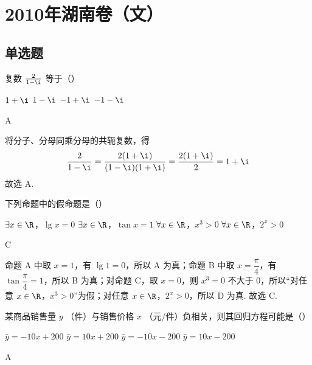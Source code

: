 \chapter{2010年湖南卷（文）}

\section{单选题}

\begin{problem}
复数 \(\frac{2}{1 - \i}\) 等于（\quad）

\choices
    {\(1 + \i\)}
    {\(1 - \i\)}
    {\(-1 + \i\)}
    {\(-1 - \i\)}
\end{problem}

\begin{answer}
A
\end{answer}

\begin{solution}
将分子、分母同乘分母的共轭复数，得
\[
\frac{2}{1-\i}=\frac{2(1+\i)}{(1-\i)(1+\i)}=\frac{2(1+\i)}{2}=1+\i
\]
故选 A.
\end{solution}

\begin{problem}
下列命题中的假命题是（\quad）

\choices
    {\(\exists x \in \R\)，\(\lg x = 0\)}
    {\(\exists x \in \R\)，\(\tan x = 1\)}
    {\(\forall x\in \R\)，\(x^3 >0\)}
    {\(\forall x\in \R\)，\(2^{x} > 0\)}
\end{problem}

\begin{answer}
C
\end{answer}

\begin{solution}
命题 A 中取 \(x=1\)，有 \(\lg 1=0\)，所以 A 为真；命题 B 中取 \(x=\dfrac{\pi}{4}\)，有 \(\tan\dfrac{\pi}{4}=1\)，所以 B 为真；对命题 C，取 \(x=0\)，则 \(x^3=0\) 不大于 \(0\)，所以“对任意 \(x\in\R\)，\(x^3>0\)”为假；对任意 \(x\in\R\)，\(2^x>0\)，所以 D 为真.
故选 C.
\end{solution}

\begin{problem}
某商品销售量 \( y \) （件）与销售价格 \( x \) （元/件）负相关，则其回归方程可能是（\quad）

\choices
    {\(\hat{y} = -10x + 200\)}
    {\(\hat{y} = 10x + 200\)}
    {\(\hat{y} = -10x - 200\)}
    {\(\hat{y} = 10x - 200\)}
\end{problem}

\begin{answer}
A
\end{answer}

